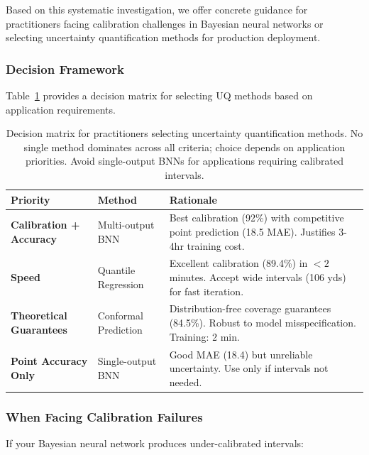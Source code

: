 Based on this systematic investigation, we offer concrete guidance for practitioners facing calibration challenges in Bayesian neural networks or selecting uncertainty quantification methods for production deployment.

\subsubsection{Decision Framework}

Table~\ref{tab:practitioner_decision_matrix} provides a decision matrix for selecting UQ methods based on application requirements.

\begin{table}[t]
\centering
\begin{tabular}{@{}llp{6cm}@{}}
\toprule
\textbf{Priority} & \textbf{Method} & \textbf{Rationale} \\
\midrule
\textbf{Calibration + Accuracy} & Multi-output BNN & Best calibration (92\%) with competitive point prediction (18.5 MAE). Justifies 3-4hr training cost. \\
\addlinespace
\textbf{Speed} & Quantile Regression & Excellent calibration (89.4\%) in $<2$ minutes. Accept wide intervals (106 yds) for fast iteration. \\
\addlinespace
\textbf{Theoretical Guarantees} & Conformal Prediction & Distribution-free coverage guarantees (84.5\%). Robust to model misspecification. Training: 2 min. \\
\addlinespace
\textbf{Point Accuracy Only} & Single-output BNN & Good MAE (18.4) but unreliable uncertainty. Use only if intervals not needed. \\
\bottomrule
\end{tabular}
\caption{Decision matrix for practitioners selecting uncertainty quantification methods. No single method dominates across all criteria; choice depends on application priorities. Avoid single-output BNNs for applications requiring calibrated intervals.}
\label{tab:practitioner_decision_matrix}
\end{table}

\subsubsection{When Facing Calibration Failures}

If your Bayesian neural network produces under-calibrated intervals:


